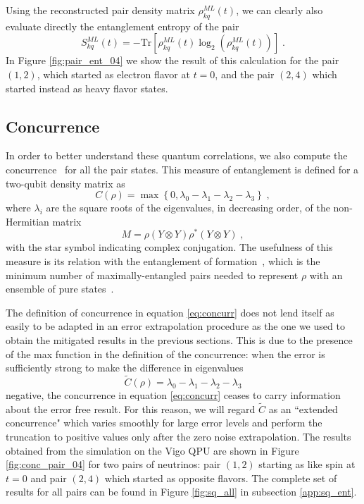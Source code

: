 \documentclass[Dual]{msu-thesis}
\begin{document}
Using the reconstructed pair density matrix ${\rho}^{ML}_{kq}(t)$, we can clearly also evaluate directly the entanglement entropy of the pair
\begin{equation}
 S^{ML}_{kq}(t) = - \text{Tr} \left[{\rho}^{ML}_{kq}(t)\log_2\left({\rho}^{ML}_{kq}(t)\right)\right]\;.
\end{equation}
In Figure \ref{fig:pair_ent_04} we show the result of this calculation for the pair $(1,2)$, which started as electron flavor at $t=0$, and the pair $(2,4)$ which started instead as heavy flavor states.

\subsection{Concurrence}

In order to better understand these quantum correlations, we also compute the concurrence~\cite{Wooters1998} for all the pair states. This measure of entanglement is defined for a two-qubit density matrix as
\begin{equation}
\label{eq:concurr}
C(\rho) = \max\left\{0,\lambda_0-\lambda_1-\lambda_2-\lambda_3\right\}\;,
\end{equation}
where $\lambda_i$ are the square roots of the eigenvalues, in decreasing order, of the non-Hermitian matrix
\begin{equation}
M = \rho\left(Y\otimes Y\right)\rho^*\left(Y\otimes Y\right)\;,
\label{eq:concurr_M}
\end{equation}
with the star symbol indicating complex conjugation. The usefulness of this measure is its relation with the entanglement of formation~\cite{Hill1997,Wooters1998}, which is the minimum number of maximally-entangled pairs needed to represent $\rho$ with an ensemble of pure states~\cite{Hill1997}. 

The definition of concurrence in equation \eqref{eq:concurr} does not lend itself as easily to be adapted in an error extrapolation procedure as the one we used to obtain the mitigated results in the previous sections. This is due to the presence of the max function in the definition of the concurrence: when the error is sufficiently strong to make the difference in eigenvalues
\begin{equation}
\widetilde{C}(\rho) = \lambda_0-\lambda_1-\lambda_2-\lambda_3
\end{equation}
negative, the concurrence in equation \eqref{eq:concurr} ceases to carry information about the error free result. For this reason, we will regard $\widetilde{C}$ as an ``extended concurrence" which varies smoothly for large error levels and perform the truncation to positive values only after the zero noise extrapolation.
The results obtained from the simulation on the Vigo QPU are shown in Figure \ref{fig:conc_pair_04} for two pairs of neutrinos: pair $(1,2)$ starting as like spin at $t=0$ and pair $(2,4)$ which started as opposite flavors. The complete set of results for all pairs can be found in Figure \ref{fig:sq_all} in subsection \ref{app:sq_ent}.
\end{document}
